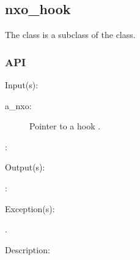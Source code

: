 %
%
%
%
%              

\subsection{nxo\_hook}
\label{nxo_hook}

The  class is a subclass of the  class.

\subsubsection{API}
\begin{capi}
\label{nxo_hook_}
	\begin{capilist}
	\item[Input(s): ]
		\begin{description}\item[]
		\item[a\_nxo: ]
			Pointer to a hook .
		\item[: ]
		\end{description}
	\item[Output(s): ]
		\begin{description}\item[]
		\item[: ]
		\end{description}
	\item[Exception(s): ]
		\begin{description}\item[]
		\item[.]
		\end{description}
	\item[Description: ]
	\end{capilist}
\end{capi}
